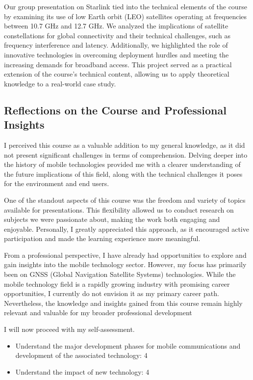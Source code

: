 Our group presentation on Starlink tied into the technical elements of the course by examining its use of low Earth orbit (LEO) satellites operating at frequencies between 10.7 GHz and 12.7 GHz. We analyzed the implications of satellite constellations for global connectivity and their technical challenges, such as frequency interference and latency. Additionally, we highlighted the role of innovative technologies in overcoming deployment hurdles and meeting the increasing demands for broadband access. This project served as a practical extension of the course’s technical content, allowing us to apply theoretical knowledge to a real-world case study.

\subsection{Reflections on the Course and Professional Insights}


I perceived this course as a valuable addition to my general knowledge, as it did not present significant challenges in terms of comprehension. Delving deeper into the history of mobile technologies provided me with a clearer understanding of the future implications of this field, along with the technical challenges it poses for the environment and end users.

One of the standout aspects of this course was the freedom and variety of topics available for presentations. This flexibility allowed us to conduct research on subjects we were passionate about, making the work both engaging and enjoyable. Personally, I greatly appreciated this approach, as it encouraged active participation and made the learning experience more meaningful.

From a professional perspective, I have already had opportunities to explore and gain insights into the mobile technology sector. However, my focus has primarily been on GNSS (Global Navigation Satellite Systems) technologies. While the mobile technology field is a rapidly growing industry with promising career opportunities, I currently do not envision it as my primary career path. Nevertheless, the knowledge and insights gained from this course remain highly relevant and valuable for my broader professional development

I will now proceed with my self-assessment.

\begin{itemize}
    \item Understand the major development phases for mobile communications and development of the associated technology: 4
    \item Understand the impact of new technology: 4
\end{itemize}

